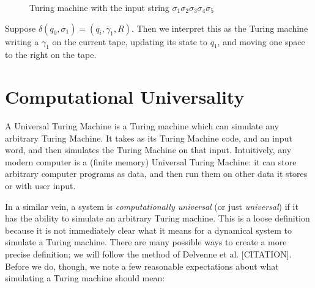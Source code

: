 \documentclass{fkpset}
\begin{document}
\begin{figure}[H]
  \caption{Turing machine with the input string $\sigma_1 \sigma_2
    \sigma_3 \sigma_4 \sigma_5$}
\end{figure}
Suppose $\delta(q_0, \sigma_1) = (q_i, \gamma_1, R)$. Then we
interpret this as the Turing machine writing a $\gamma_1$ on the
current tape, updating its state to $q_1$, and moving one space to the right on the tape.

\section{Computational Universality}

A Universal Turing Machine is a Turing machine which can simulate any arbitrary Turing Machine. It takes as its Turing Machine code, and an input word, and then simulates the Turing Machine on that input. Intuitively, any modern computer is a (finite memory) Universal Turing Machine: it can store arbitrary computer programs as data, and then run them on other data it stores or with user input.

In a similar vein, a system is {\it computationally universal} (or just {\it universal}) if it has the ability to simulate an arbitrary Turing machine. This is a loose definition because it is not immediately clear what it means for a dynamical system to simulate a Turing machine. There are many possible ways to create a more precise definition; we will follow the method of Delvenne et al. [CITATION]. Before we do, though, we note a few reasonable expectations about what simulating a Turing machine should mean:
\end{document}
